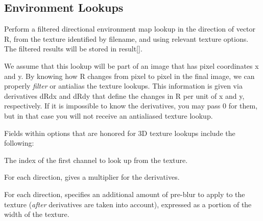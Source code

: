 \subsection{Environment Lookups}
\label{sec:texturesys:api:environment}


Perform a filtered directional environment map lookup in the direction
of vector {\cf R}, from the texture identified by {\cf filename}, and
using relevant texture {\cf options}.  The filtered results will be
stored in {\cf result[]}.

We assume that this lookup will be part of an image that has pixel
coordinates {\cf x} and {\cf y}.  By knowing how {\cf R} changes from
pixel to pixel in the final image, we can properly \emph{filter} or
antialias the texture lookups.  This information is given via
derivatives {\cf dRdx} and {\cf dRdy} that define the changes in {\cf R}
per unit of {\cf x} and {\cf y}, respectively.  If it is impossible to
know the derivatives, you may pass 0 for them, but in that case you will
not receive an antialiased texture lookup.

Fields within {\cf options} that are honored for 3D texture lookups
include the following:

\vspace{-12pt}
\vspace{10pt}
The index of the first channel to look up from the texture.
\apiend

\vspace{-24pt}
\vspace{10pt}
For each direction, gives a multiplier for the derivatives.
\apiend

\vspace{-24pt}
\vspace{10pt}
For each direction, specifies an additional amount of pre-blur to apply
to the texture (\emph{after} derivatives are taken into account),
expressed as a portion of the width of the texture.
\apiend

